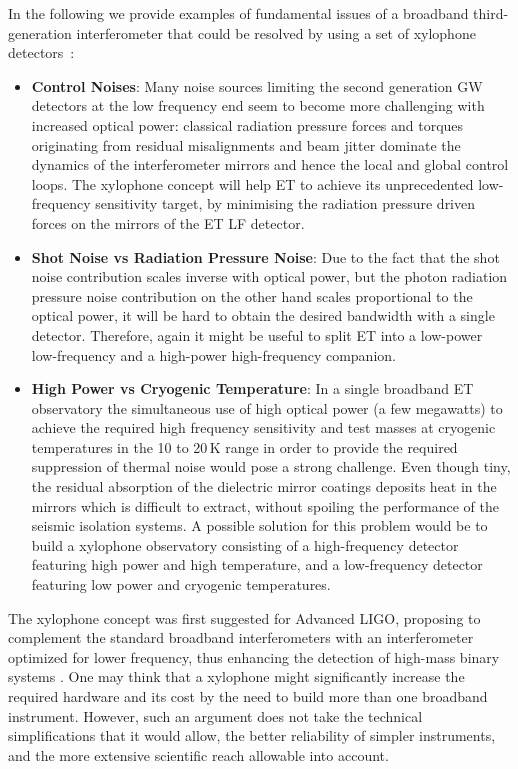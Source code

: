 In the following we provide examples of fundamental issues of a broadband
third-generation interferometer that could be resolved by using a set of
xylophone detectors~\cite{Hild2010a}:
\begin{itemize}
\item \textbf{Control Noises}: Many noise sources limiting the second generation
GW detectors at the low frequency end seem to become more challenging with
increased optical power: classical radiation pressure forces and torques
originating from residual misalignments and beam jitter dominate the dynamics of
the interferometer mirrors and hence the local and global control loops. 
The xylophone concept will help ET to achieve its unprecedented low-frequency
sensitivity target, by minimising the radiation pressure driven forces on the
mirrors of the ET LF detector. 
\item \textbf{Shot Noise vs Radiation Pressure Noise}: Due to the fact that the
shot noise contribution scales inverse with optical power, but the photon
radiation pressure noise contribution on the other hand scales proportional to
the optical power, it will be hard to obtain the desired bandwidth with a
single detector. Therefore, again it might be useful to split ET into a
low-power low-frequency and a high-power high-frequency companion.
\item \textbf{High Power vs Cryogenic Temperature}: In a single broadband ET
observatory the simultaneous use of high optical power (a few megawatts) to
achieve the required high frequency sensitivity and test masses at cryogenic
temperatures in the 10 to 20\,K range in order to provide the required
suppression of thermal noise would pose a strong challenge. Even though tiny,
the residual absorption of the dielectric mirror coatings deposits heat in the
mirrors which is difficult to extract, without spoiling the performance of the
seismic isolation systems. A possible solution for this problem would be to
build a xylophone observatory consisting of a high-frequency detector featuring
high power and high temperature, and a low-frequency detector featuring low power
and cryogenic temperatures.
\end{itemize}

The xylophone concept was first suggested for Advanced LIGO, proposing to
complement the standard broadband interferometers with an interferometer
optimized for lower frequency, thus enhancing the detection of high-mass binary
systems \cite{Shoemaker2001LIGOXylophone, Conforto2004}.
One may think that a xylophone might significantly increase the required
hardware and its cost by the need to build more than one broadband instrument.
However, such an argument does not take the technical simplifications that it
would allow, the better reliability of simpler instruments, and the more
extensive scientific reach allowable into account.

